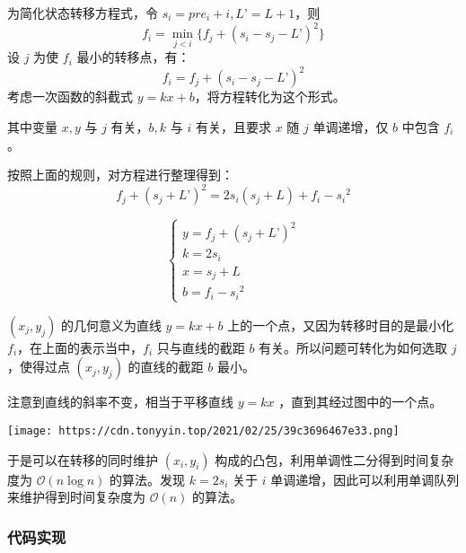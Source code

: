 为简化状态转移方程式，令 \(s_i=pre_i+i,L’=L+1\)，则 \[
f_i=\min_{j<i}\{f_j+(s_i-s_j-L’)^2\}
\] 设 \(j\) 为使 \(f_i\) 最小的转移点，有： \[
f_i=f_j+(s_i-s_j-L’)^2
\] 考虑一次函数的斜截式 \(y=kx+b\)，将方程转化为这个形式。

其中变量 \(x, y\) 与 \(j\) 有关，\(b, k\) 与 \(i\) 有关，且要求 \(x\) 随
\(j\) 单调递增，仅 \(b\) 中包含 \(f_i\)。

按照上面的规则，对方程进行整理得到： \[
f_j+(s_j+L’)^2=2s_i(s_j+L)+f_i-{s_i}^2
\]

\[
\left\{
\begin{array}{lr}
y = f_j+(s_j+L’)^2\\
k = 2s_i\\
x = s_j+L\\
b = f_i-{s_i}^2
\end{array}
\right.
\]

\((x_j, y_j)\) 的几何意义为直线 \(y=kx+b\)
上的一个点，又因为转移时目的是最小化 \(f_i\)，在上面的表示当中，\(f_i\)
只与直线的截距 \(b\) 有关。所以问题可转化为如何选取 \(j\) ，使得过点
\((x_j, y_j)\) 的直线的截距 \(b\) 最小。

注意到直线的斜率不变，相当于平移直线 \(y=kx\) ，直到其经过图中的一个点。

\texttt{[image: https://cdn.tonyyin.top/2021/02/25/39c3696467e33.png]}

于是可以在转移的同时维护 \((x_i,y_i)\)
构成的凸包，利用单调性二分得到时间复杂度为 \(\mathcal{O}(n\log n)\)
的算法。发现 \(k=2s_i\) 关于 \(i\)
单调递增，因此可以利用单调队列来维护得到时间复杂度为 \(\mathcal{O}(n)\)
的算法。

\subsubsection{代码实现}

